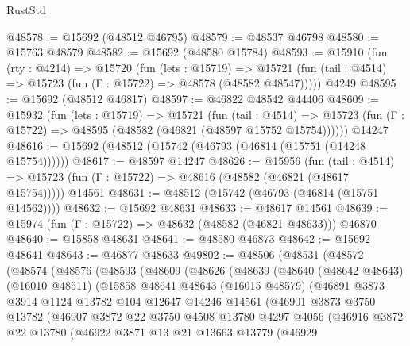 \begin{lexlean}{RustStd}
\begin{coremodule}
@48578 := @15692 (@48512 @46795)
@48579 := @48537 @46798
@48580 := @15763 @48579
@48582 := @15692 (@48580 @15784)
@48593 := @15910
    (fun (rty : @4214) =>
    @15720
      (fun (lets : @15719) =>
      @15721 (fun (tail : @4514) => @15723 (fun (Γ : @15722) => @48578 (@48582 @48547)))))
    @4249
@48595 := @15692 (@48512 @46817)
@48597 := @46822 @48542 @44406
@48609 := @15932
    (fun (lets : @15719) =>
    @15721
      (fun (tail : @4514) =>
      @15723 (fun (Γ : @15722) => @48595 (@48582 (@46821 (@48597 @15752 @15754))))))
    @14247
@48616 := @15692 (@48512 (@15742 (@46793 (@46814 (@15751 (@14248 @15754))))))
@48617 := @48597 @14247
@48626 := @15956
    (fun (tail : @4514) => @15723 (fun (Γ : @15722) => @48616 (@48582 (@46821 (@48617 @15754)))))
    @14561
@48631 := @48512 (@15742 (@46793 (@46814 (@15751 @14562))))
@48632 := @15692 @48631
@48633 := @48617 @14561
@48639 := @15974 (fun (Γ : @15722) => @48632 (@48582 (@46821 @48633))) @46870
@48640 := @15858 @48631
@48641 := @48580 @46873
@48642 := @15692 @48641
@48643 := @46877 @48633
@49802 := @48506
    (@48531
      (@48572
        (@48574
          (@48576
            (@48593
              (@48609
                (@48626
                  (@48639
                    (@48640
                      (@48642 @48643)
                      (@16010 @48511)
                      (@15858
                        @48641
                        @48643
                        (@16015 @48579)
                        (@46891
                          @3873
                          @3914
                          @1124
                          @13782
                          @104
                          @12647
                          @14246
                          @14561
                          (@46901
                            @3873
                            @3750
                            @13782
                            (@46907
                              @3872
                              @22
                              @3750
                              @4508
                              @13780
                              @4297
                              @4056
                              (@46916
                                @3872
                                @22
                                @13780
                                (@46922
                                  @3871
                                  @13
                                  @21
                                  @13663
                                  @13779
                                  (@46929

\end{coremodule}
\end{lexlean}
